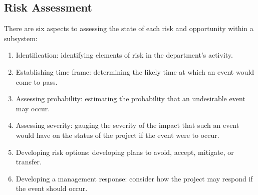 \subsection{Risk Assessment}

There are six aspects to assessing the state of each risk and opportunity within a subsystem:
\begin{enumerate}
\item Identification: identifying elements of risk in the department’s activity.
\item Establishing time frame: determining the likely time at which an event would come to pass.
\item Assessing probability: estimating the probability that an undesirable event may occur.
\item Assessing severity: gauging the severity of the impact that such an event would have on the status of the project if the event were to occur.
\item Developing risk options: developing plans to avoid, accept, mitigate, or transfer.
\item Developing a management response: consider how the project may respond if the event should occur.
\end{enumerate}
